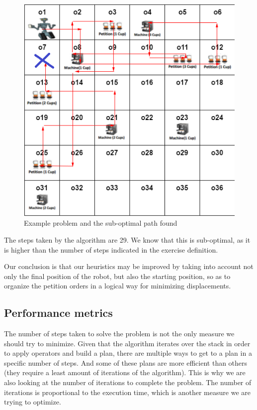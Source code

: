 \documentclass[12pt,a4paper,oneside]{article}
\numberwithin{equation}{section}
\numberwithin{equation}{section}
\theoremstyle{definition}
\begin{document}
\begin{figure}[H]
	\centering
	\includegraphics[scale=0.7]{figures/example_problem.png}
	\caption{Example problem and the sub-optimal path found}
	\label{example_optimality} 
\end{figure}

The steps taken by the algorithm are 29. We know that this is sub-optimal, as it is higher than the number of steps indicated in the exercise definition.

Our conclusion is that our heuristics may be improved by taking into account not only the final position of the robot, but also the starting position, so as to organize the petition orders in a logical way for minimizing displacements.

\subsection{Performance metrics}
The number of steps taken to solve the problem is not the only measure we should try to minimize. Given that the algorithm iterates over the stack in order to apply operators and build a plan, there are multiple ways to get to a plan in a specific number of steps. And some of these plans are more efficient than others (they require a least amount of iterations of the algorithm). This is why we are also looking at the number of iterations to complete the problem. The number of iterations is proportional to the execution time, which is another measure we are trying to optimize. 
\end{document}
